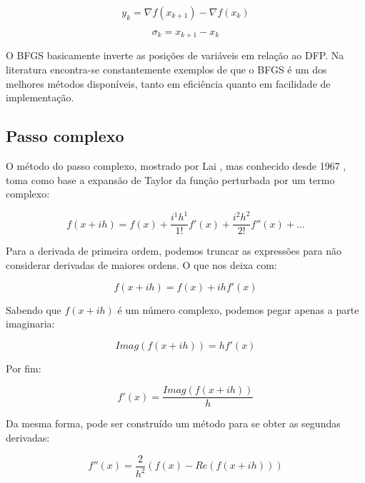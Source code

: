 \begin{equation}
y_k = \nabla f(x_{k+1}) - \nabla f(x_k)
\end{equation}

\begin{equation}
\sigma_k = x_{k+1} - x_k
\end{equation}

O BFGS basicamente inverte as posições de variáveis em relação ao DFP.
Na literatura encontra-se constantemente exemplos de que o BFGS é um dos melhores
métodos disponíveis, tanto em eficiência quanto em facilidade de implementação.




\subsection{Passo complexo}
O método do passo complexo, mostrado por Lai \cite{Lai_2005}, mas
conhecido desde 1967 \cite{Lyness_1967}, toma como base a expansão de Taylor da função
perturbada por um termo complexo:

\begin{equation}
f(x + ih) = f(x) + \frac{i^1h^1}{1!}f'(x) + \frac{i^2h^2}{2!} f''(x) + ...
\end{equation}

Para a derivada de primeira ordem, podemos truncar as expressões para não considerar derivadas
de maiores ordens. O que nos deixa com:


\begin{equation}
f(x + ih) = f(x) + ihf'(x)
\end{equation}

Sabendo que \(f(x+ih)\) é um número complexo, podemos pegar apenas a parte imaginaria:

\begin{equation}
Imag(f(x + ih)) = hf'(x)
\end{equation}

Por fim:

\begin{equation}
f'(x) = \frac{Imag(f(x + ih))}{h}
\end{equation}

Da mesma forma, pode ser construído um método para se obter as segundas derivadas:

\begin{equation}
f''(x) = \frac{2}{h^2} (f(x) - Re(f(x+ih)))
\end{equation}

